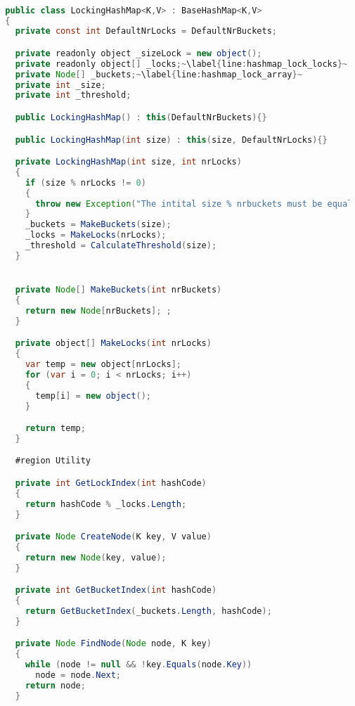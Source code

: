 \begin{lstlisting}[label=lst:impl_hashmap_lock,
  caption={Lock Based Concurrent Hashmap Implementation},
  language=Java,  
  showspaces=false,
  showtabs=false,
  breaklines=true,
  showstringspaces=false,
  breakatwhitespace=true,
  commentstyle=\color{greencomments},
  keywordstyle=\color{bluekeywords},
  stringstyle=\color{redstrings},
  escapechar=~,
  morekeywords={atomic, retry, orelse, var, get, set, ref, out, readonly, virtual, override, region, endregion, foreach, lock}]  % Start your code-block

  public class LockingHashMap<K,V> : BaseHashMap<K,V>
  {
    private const int DefaultNrLocks = DefaultNrBuckets;

    private readonly object _sizeLock = new object();
    private readonly object[] _locks;~\label{line:hashmap_lock_locks}~
    private Node[] _buckets;~\label{line:hashmap_lock_array}~
    private int _size;
    private int _threshold;

    public LockingHashMap() : this(DefaultNrBuckets){}

    public LockingHashMap(int size) : this(size, DefaultNrLocks){}

    private LockingHashMap(int size, int nrLocks)
    {
      if (size % nrLocks != 0)
      {
        throw new Exception("The intital size % nrbuckets must be equal to zero");
      }
      _buckets = MakeBuckets(size);
      _locks = MakeLocks(nrLocks);
      _threshold = CalculateThreshold(size);
    }


    private Node[] MakeBuckets(int nrBuckets)
    {
      return new Node[nrBuckets]; ;
    }

    private object[] MakeLocks(int nrLocks)
    {
      var temp = new object[nrLocks];
      for (var i = 0; i < nrLocks; i++)
      {
        temp[i] = new object();
      }

      return temp;
    }

    #region Utility

    private int GetLockIndex(int hashCode)
    {
      return hashCode % _locks.Length;
    }

    private Node CreateNode(K key, V value)
    {
      return new Node(key, value);
    }

    private int GetBucketIndex(int hashCode)
    {
      return GetBucketIndex(_buckets.Length, hashCode);
    }

    private Node FindNode(Node node, K key)
    {
      while (node != null && !key.Equals(node.Key))
        node = node.Next;
      return node;
    }


\end{lstlisting}
